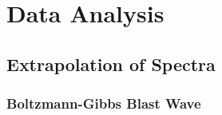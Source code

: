 \chapter{Data Analysis} \label{ch:analysis}
\section{Extrapolation of Spectra}
\subsection{Boltzmann-Gibbs Blast Wave}


